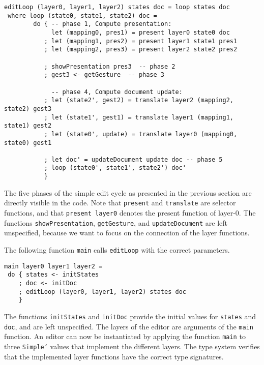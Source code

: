 \begin{small}
\begin{verbatim}
editLoop (layer0, layer1, layer2) states doc = loop states doc
 where loop (state0, state1, state2) doc = 
        do { -- phase 1, Compute presentation:
             let (mapping0, pres1) = present layer0 state0 doc
           ; let (mapping1, pres2) = present layer1 state1 pres1
           ; let (mapping2, pres3) = present layer2 state2 pres2

           ; showPresentation pres3  -- phase 2
           ; gest3 <- getGesture  -- phase 3
 
             -- phase 4, Compute document update: 
           ; let (state2', gest2) = translate layer2 (mapping2, state2) gest3
           ; let (state1', gest1) = translate layer1 (mapping1, state1) gest2
           ; let (state0', update) = translate layer0 (mapping0, state0) gest1
       
           ; let doc' = updateDocument update doc -- phase 5
           ; loop (state0', state1', state2') doc'
           }
\end{verbatim}
\end{small}

The five phases of the simple edit cycle as presented in the previous section are directly visible in the code. Note that \texttt{present} and \texttt{translate} are selector functions, and that \texttt{present layer0} denotes the present function of layer-0. The functions \texttt{showPresentation}, \texttt{getGesture}, and \texttt{updateDocument} are left unspecified, because we want to focus on the connection of the layer functions. 

The following function \texttt{main} calls \texttt{editLoop} with the correct parameters.

\begin{small}
\begin{verbatim}
main layer0 layer1 layer2 = 
 do { states <- initStates
    ; doc <- initDoc 
    ; editLoop (layer0, layer1, layer2) states doc
    }
\end{verbatim}
\end{small}

The functions \texttt{initStates} and \texttt{initDoc} provide the initial values for \texttt{states} and \texttt{doc}, and are left unspecified. The layers of the editor are arguments of the \texttt{main} function. An editor can now be instantiated by applying the function \texttt{main} to three \texttt{Simple'} values that implement the different layers. The type system verifies that the implemented layer functions have the correct type signatures.

